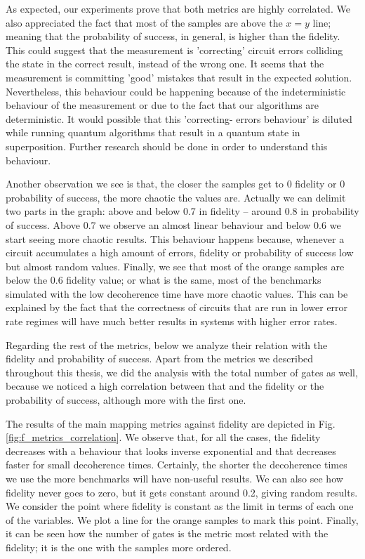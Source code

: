 As expected, our experiments prove that both metrics are highly correlated.
We also appreciated the fact that most of the samples are above the \(x=y\) line; meaning that the probability of success, in general, is higher than the fidelity.
This could suggest that the measurement is 'correcting' circuit errors colliding the state in the correct result, instead of the wrong one.
It seems that the measurement is committing 'good' mistakes that result in the expected solution.
Nevertheless, this behaviour could be happening because of the indeterministic behaviour of the measurement or due to the fact that our algorithms are deterministic.
It would possible that this 'correcting- errors behaviour' is diluted while running quantum algorithms that result in a quantum state in superposition.
Further research should be done in order to understand this behaviour.

Another observation we see is that, the closer the samples get to 0 fidelity or 0 probability of success, the more chaotic the values are. Actually we can delimit two parts in the graph: above and below 0.7 in fidelity -- around 0.8 in probability of success. Above 0.7 we observe an almost linear behaviour and below 0.6 we start seeing more chaotic results. This behaviour happens because, whenever a circuit accumulates a high amount of errors, fidelity or probability of success low but almost random values.
Finally, we see that most of the orange samples are below the 0.6 fidelity value; or what is the same, most of the benchmarks simulated with the low decoherence time have more chaotic values. 
This can be explained by the fact that the correctness of circuits that are run in lower error rate regimes will have much better results in systems with higher error rates.


Regarding the rest of the metrics, below we analyze their relation with the fidelity and probability of success.
Apart from the metrics we described throughout this thesis, we did the analysis with the total number of gates as well, because we noticed a high correlation between that and the fidelity or the probability of success, although more with the first one.


The results of the main mapping metrics against fidelity are depicted in Fig. \ref{fig:f_metrics_correlation}.
We observe that, for all the cases, the fidelity decreases with a behaviour that looks inverse exponential and that decreases faster for small decoherence times.
Certainly, the shorter the decoherence times we use the more benchmarks will have non-useful results.
We can also see how fidelity never goes to zero, but it gets constant around 0.2, giving random results.
We consider the point where fidelity is constant as the limit in terms of each one of the variables.
We plot a line for the orange samples to mark this point.
Finally, it can be seen how the number of gates is the metric most related with the fidelity; it is the one with the samples more ordered.

